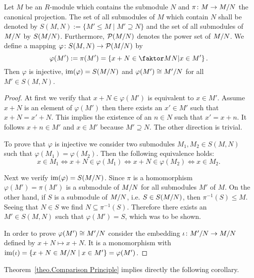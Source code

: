 \begin{thm} \label{theo.Comparison Principle}
Let $M$ be an $R$-module which contains the submodule $N$ and $\pi\colon M\to\MtN$ the canonical projection. The set of all submodules of $M$ which contain $N$ shall be denoted by $S(M,N):=\lbrace M'\leq M \mid M'\supseteq N\rbrace$ and the set of all submodules of $\MtN$ by $S(\MtN)$. Furthermore, $\mathcal{P}(\MtN)$ denotes the power set of $\MtN$. We define a mapping $\varphi\colon S(M,N)\to \mathcal{P}(\MtN)$ by
\begin{equation*}
\varphi(M'):=\pi(M')=\left\lbrace x+N\in \MTN \middle\arrowvert x\in M'\right\rbrace.
\end{equation*}
Then $\varphi$ is injective, $\im(\varphi)=S(\MtN)$ and $\varphi(M')\cong\nicefrac{M'}{N}$ for all $M'\in S(M,N)$.
\end{thm}
\begin{proof}
At first we verify that $x+N\in \varphi(M')$ is equivalent to $x\in M'$. Assume $x+N$ is an element of $\varphi(M')$ then there exists an $x'\in M'$ such that $x+N=x'+N$. This implies the existence of an $n\in N$ such that $x'=x+n$. It follows $x+n\in M'$ and $x\in M'$ because $M'\supseteq N$. The other direction is trivial.

To prove that $\varphi$ is injective we consider two submodules $M_1,M_2\in S(M,N)$ such that $\varphi(M_1)=\varphi(M_2)$. Then the following equivalence holds:
\begin{equation*}
x\in M_1\Leftrightarrow x+N\in \varphi(M_1)\Leftrightarrow x+N\in\varphi(M_2)\Leftrightarrow x\in M_2.
\end{equation*}

Next we verify $\im(\varphi)=S(\MtN)$. Since $\pi$ is a homomorphism $\varphi(M')=\pi(M')$ is a submodule of $\MtN$ for all submodules $M'$ of $M$. On the other hand, if $S$ is a submodule of $\MtN$, i.e. $S\in S(\MtN)$, then $\pi^{-1}(S)\leq M$. Seeing that $N\in S$ we find $N\subseteq\pi^{-1}(S)$. Therefore there exists an $M'\in S(M,N)$ such that $\varphi(M')=S$, which was to be shown.

In order to prove $\varphi(M')\cong\nicefrac{M'}{N}$ consider the embedding $\iota\colon \nicefrac{M'}{N}\to\MtN$ defined by $x+N\mapsto x+N$. It is a monomorphism with $\im(\iota)=\lbrace x+N\in\MtN \mid x\in M'\rbrace=\varphi(M')$.
\end{proof}


Theorem~\ref{theo.Comparison Principle} implies directly the following corollary.

